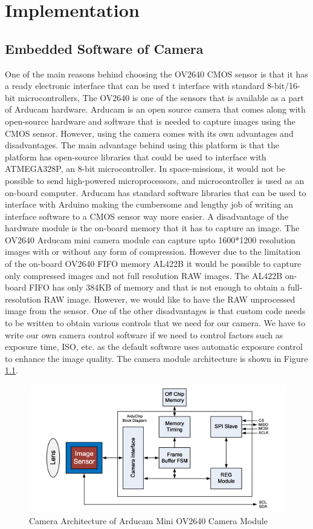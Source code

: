 \chapter{Implementation}

\section{Embedded Software of Camera}
One of the main reasons behind choosing the OV2640 CMOS sensor is that it has a ready electronic interface that can be used t interface with standard 8-bit/16-bit microcontrollers,  The OV2640 is one of the sensors that is available as a part of Arducam hardware. Arducam is an open source camera that comes along with open-source hardware and software that is needed to capture images using the CMOS sensor. However, using the camera comes with its own advantages and disadvantages. The main advantage behind using this platform is that the platform has open-source libraries that could be used to interface with ATMEGA328P, an 8-bit microcontroller. In space-missions, it would not be possible to send high-powered microprocessors, and microcontroller is used as an on-board computer. Arducam has standard software libraries that can be used to interface with Arduino making the cumbersome and lengthy job of writing an interface software to a CMOS sensor way more easier.  A disadvantage of the hardware module is the on-board memory that it has to capture an image. The OV2640 Arducam mini camera module can capture upto 1600*1200 resolution images with or without any form of compression. However due to the limitation of the on-board OV2640 FIFO memory AL422B it would be possible to capture only compressed images and not full resolution RAW images. The AL422B on-board FIFO has only 384KB of memory and that is not enough to obtain a full-resolution RAW image. However, we would like to have the RAW unprocessed image from the sensor. One of the other disadvantages is that custom code needs to be written to obtain various controls that we need for our camera. We have to write our own camera control software if we need to control factors such as exposure time, ISO, etc. as the default software uses automatic exposure control to enhance the image quality. The camera module architecture is shown in Figure \ref{fig:arducam_arch}.

 \begin{figure}[!htbp]
\centering
\includegraphics[scale=0.75]{pics/arducam_architecture}
\caption{Camera Architecture of Arducam Mini OV2640 Camera Module}
\label{fig:arducam_arch}
\end{figure}


